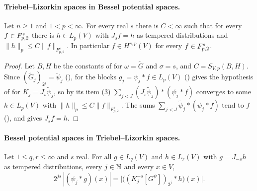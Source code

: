\paragraph{Triebel--Lizorkin spaces in Bessel potential spaces.}

\begin{theorem}[$\TL{s}{p}{2} \subseteq H^{s,p}$]
\label{thm:triebel-lizorkin-to-bessel}
\leanok
{}
Let $n \geq 1$ and $1 < p < \infty$. For every real $s$ there is $C < \infty$ such that for every
$f \in F^{s}_{p,2}$ there is $h \in L_p(V)$ with $J_s f = h$ as tempered distributions and
$\|h\|_p \leq C \|f\|_{F^s_{p,2}}$. In particular $f \in H^{s,p}(V)$ for every
$f \in F^{s}_{p,2}$.
\end{theorem}

\begin{proof}
\leanok
Let $B, H$ be the constants of  for $\omega = \tilde G$ and
$\sigma = s$, and $C = S_{V,p}(B, H)$. Since $(\tilde G_j)_{2^j} = \tilde\psi_j$
(),  for the blocks
$g_j = \psi_j * f \in L_p(V)$ () gives the hypothesis of
 for $K_j = J_s \tilde\psi_j$, so by its item (3)
$\sum_{j < J} (J_s \tilde\psi_j) * (\psi_j * f)$ converges to some $h \in L_p(V)$ with
$\|h\|_p \leq C \|f\|_{F^s_{p,2}}$. The sums $\sum_{j < J} \tilde\psi_j * (\psi_j * f)$ tend to
$f$ (), and  gives
$J_s f = h$.
\end{proof}

\paragraph{Bessel potential spaces in Triebel--Lizorkin spaces.}

\begin{lemma}
\label{lem:bessel-potential-blocks}
\leanok
{}
Let $1 \leq q, r \leq \infty$ and $s$ real. For all $g \in L_q(V)$ and $h \in L_r(V)$ with
$g = J_{-s} h$ as tempered distributions, every $j \in \mathbb{N}$ and every $x \in V$,
\[
  2^{js} \, |(\psi_j * g)(x)| = \bigl| \bigl( (K^{-s}_j[G^{\psi}])_{2^j} * h \bigr)(x) \bigr| .
\]
\end{lemma}

